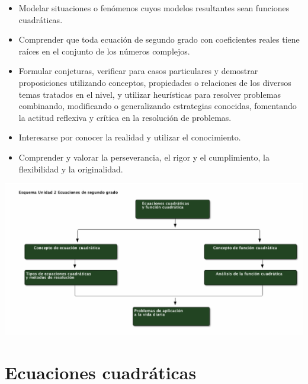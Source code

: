 \documentclass[12pt,letterpaper,article,x11names]{memoir}
\begin{document}
\begin{itemize}
\item Modelar situaciones o fenómenos cuyos modelos resultantes sean funciones cuadráticas.
\item Comprender que toda ecuación de segundo grado con coeficientes reales tiene raíces en el conjunto de los números complejos.
\item Formular conjeturas, verificar para casos particulares y demostrar proposiciones utilizando conceptos, propiedades o relaciones de los diversos temas tratados en el nivel, y utilizar heurísticas para resolver problemas combinando, modificando o generalizando estrategias conocidas, fomentando la actitud reflexiva y crítica en la resolución de problemas.
\item Interesarse por conocer la realidad y utilizar el conocimiento.
\item Comprender y valorar la perseverancia, el rigor y el cumplimiento, la flexibilidad y la originalidad.
\end{itemize}

\begin{center}
\includegraphics[width=.9\linewidth]{esquema_unidad2.png}
\end{center}

\section{Ecuaciones cuadráticas}
\label{sec:orgd9d1b97}
\end{document}
